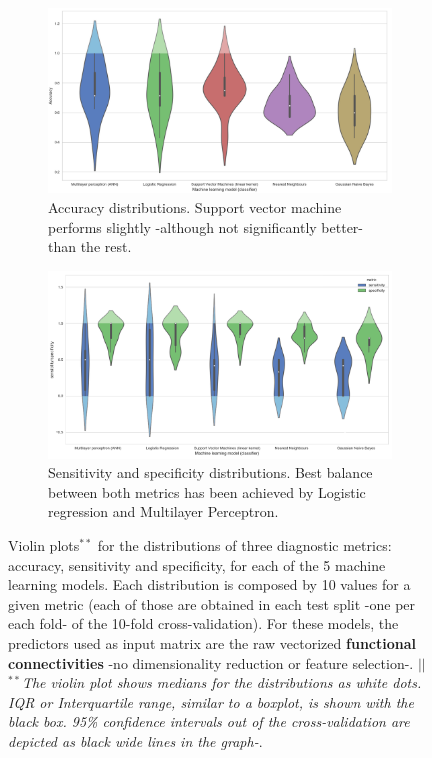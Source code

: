 \documentclass[a4paper,12pt]{elsarticle}  %
\begin{document}
		
		\begin{figure}[h]
			\centering
			\begin{subfigure}[a]{1\textwidth}
				\includegraphics[width=1\textwidth]{fig_comparacio_models_fMRI_nodimreduc_ACCURACYPLOT.png}
				\caption{Accuracy distributions. Support vector machine performs slightly -although not significantly better- than the rest.}
				\label{fig_comparacio_models_fMRI_nodimreduc_ACCURACYPLOT} 
			\end{subfigure}
			\begin{subfigure}[b]{1\textwidth}
				\includegraphics[width=1\textwidth]{fig_comparacio_models_fMRI_nodimreduc_SENSIBILITATESPECIFICITAT.png}
				\caption{Sensitivity and specificity distributions. Best balance between both metrics has been achieved by Logistic regression and Multilayer Perceptron.}
				\label{fig_comparacio_models_fMRI_nodimreduc_SENSIBILITATESPECIFICITAT}
			\end{subfigure}
			
			\caption{Violin plots$^{**}$ for the distributions of three diagnostic metrics: accuracy, sensitivity and specificity, for each of the 5 machine learning models. Each distribution is composed by 10 values for a given metric (each of those are obtained in each test split -one per each fold- of the 10-fold cross-validation). For these models, the predictors used as input matrix are the raw vectorized \textbf{functional connectivities} -no dimensionality reduction or feature selection-. $||$ $^{**}$\textit{The violin plot shows medians for the distributions as white dots. IQR or Interquartile range, similar to a boxplot, is shown with the black box. 95\% confidence intervals out of the cross-validation are depicted as black wide lines in the graph-}.}
		\end{figure}
		\clearpage	
		
\end{document}

